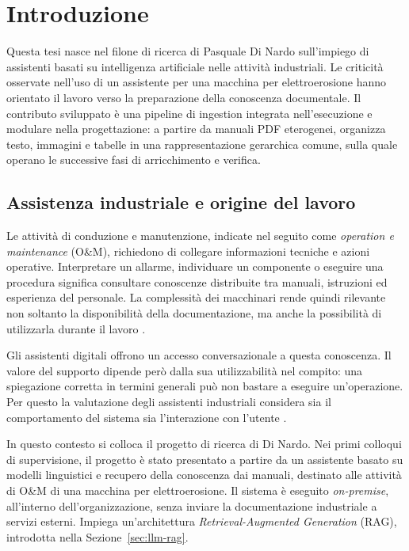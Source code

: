 \chapter{Introduzione}
\label{cap:introduzione}

Questa tesi nasce nel filone di ricerca di Pasquale Di Nardo sull'impiego di assistenti basati su intelligenza artificiale nelle attività industriali. Le criticità osservate nell'uso di un assistente per una macchina per elettroerosione hanno orientato il lavoro verso la preparazione della conoscenza documentale. Il contributo sviluppato è una pipeline di ingestion integrata nell'esecuzione e modulare nella progettazione: a partire da manuali PDF eterogenei, organizza testo, immagini e tabelle in una rappresentazione gerarchica comune, sulla quale operano le successive fasi di arricchimento e verifica.

\section{Assistenza industriale e origine del lavoro}
\label{sec:assistenza-cognitiva}
\label{sec:progetto-quadro}

Le attività di conduzione e manutenzione, indicate nel seguito come \emph{operation e maintenance} (O\&M), richiedono di collegare informazioni tecniche e azioni operative. Interpretare un allarme, individuare un componente o eseguire una procedura significa consultare conoscenze distribuite tra manuali, istruzioni ed esperienza del personale. La complessità dei macchinari rende quindi rilevante non soltanto la disponibilità della documentazione, ma anche la possibilità di utilizzarla durante il lavoro \parencite{ludwig2025ontology}.

Gli assistenti digitali offrono un accesso conversazionale a questa conoscenza. Il valore del supporto dipende però dalla sua utilizzabilità nel compito: una spiegazione corretta in termini generali può non bastare a eseguire un'operazione. Per questo la valutazione degli assistenti industriali considera sia il comportamento del sistema sia l'interazione con l'utente \parencite{colabianchi2024assessment}.

In questo contesto si colloca il progetto di ricerca di Di Nardo. Nei primi colloqui di supervisione, il progetto è stato presentato a partire da un assistente basato su modelli linguistici e recupero della conoscenza dai manuali, destinato alle attività di O\&M di una macchina per elettroerosione. Il sistema è eseguito \emph{on-premise}, all'interno dell'organizzazione, senza inviare la documentazione industriale a servizi esterni. Impiega un'architettura \emph{Retrieval-Augmented Generation} (RAG), introdotta nella Sezione~\ref{sec:llm-rag}.

